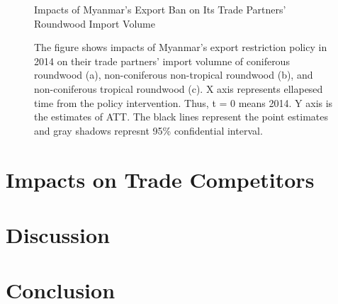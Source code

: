 \documentclass[a4paper,12pt]{article}
\begin{document}
\begin{figure}[H] 
    \centering
    \caption{Impacts of Myanmar's Export Ban on Its Trade Partners' Roundwood Import Volume}
    \caption*{\small{The figure shows impacts of Myanmar's export restriction policy in 2014 on their trade partners' import volumne of coniferous roundwood (a), non-coniferous non-tropical roundwood (b), and non-coniferous tropical roundwood (c). X axis represents ellapesed time from the policy intervention. Thus, t = 0 means 2014. Y axis is the estimates of ATT. The black lines represent the point estimates and gray shadows represnt 95\% confidential interval.}}
    \label{fig:att_imp_Myanmar}
\end{figure}

\section{Impacts on Trade Competitors}

\section{Discussion}

\section{Conclusion}


\end{document}
